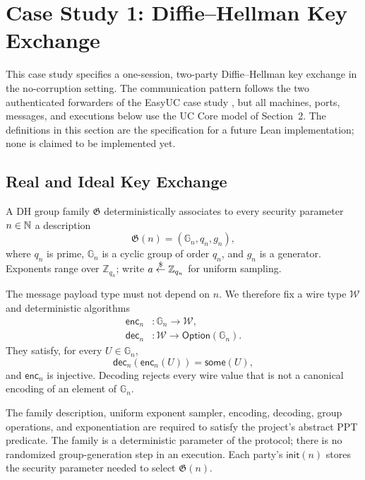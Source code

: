 \section{Case Study 1: Diffie--Hellman Key Exchange}

This case study specifies a one-session, two-party Diffie--Hellman key
exchange in the no-corruption setting.  The communication pattern follows the
two authenticated forwarders of the EasyUC case study
\cite{canettistoughtonvaria2019easyuc}, but all machines, ports, messages, and
executions below use the UC Core model of Section~2.  The definitions in this
section are the specification for a future Lean implementation; none is
claimed to be implemented yet.

\subsection{Real and Ideal Key Exchange}

\begin{definition}
\label{def:dhke-group-family}
\notready
A DH group family \(\mathfrak G\) deterministically associates to every
security parameter \(n\in\mathbb{N}\) a description
\[
  \mathfrak G(n)=(\mathbb G_n,q_n,g_n),
\]
where \(q_n\) is prime, \(\mathbb G_n\) is a cyclic group of order \(q_n\),
and \(g_n\) is a generator.  Exponents range over
\(\mathbb Z_{q_n}\); write \(a\stackrel{\smash{\$}}\gets\mathbb Z_{q_n}\) for uniform sampling.

The message payload type must not depend on \(n\).  We therefore fix a wire
type \(\mathcal W\) and deterministic algorithms
\[
\begin{aligned}
  \mathsf{enc}_n &: \mathbb G_n\longrightarrow\mathcal W,\\
  \mathsf{dec}_n &: \mathcal W\longrightarrow
    \mathsf{Option}(\mathbb G_n).
\end{aligned}
\]
They satisfy, for every \(U\in\mathbb G_n\),
\[
  \mathsf{dec}_n(\mathsf{enc}_n(U))=\mathsf{some}(U),
\]
and \(\mathsf{enc}_n\) is injective.  Decoding rejects every wire value that
is not a canonical encoding of an element of \(\mathbb G_n\).

The family description, uniform exponent sampler, encoding, decoding, group
operations, and exponentiation are required to satisfy the project's abstract
PPT predicate.  The family is a deterministic parameter of the protocol;
there is no randomized group-generation step in an execution.  Each party's
\(\mathsf{init}(n)\) stores the security parameter needed to select
\(\mathfrak G(n)\).
\end{definition}

